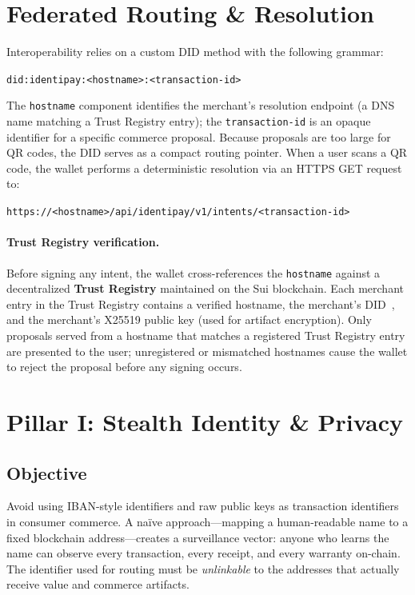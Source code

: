 \documentclass[11pt]{article}
\begin{document}
\section{Federated Routing \& Resolution}
Interoperability relies on a custom DID method with the following grammar:
\begin{center}
\texttt{did:identipay:<hostname>:<transaction-id>}
\end{center}
The \texttt{hostname} component identifies the merchant's resolution endpoint (a DNS name matching a Trust Registry entry); the \texttt{transaction-id} is an opaque identifier for a specific commerce proposal. Because proposals are too large for QR codes, the DID serves as a compact routing pointer. When a user scans a QR code, the wallet performs a deterministic resolution via an HTTPS GET request to:
\begin{center}
\texttt{https://<hostname>/api/identipay/v1/intents/<transaction-id>}
\end{center}

\paragraph{Trust Registry verification.}
Before signing any intent, the wallet cross-references the \texttt{hostname} against a decentralized \textbf{Trust Registry} maintained on the Sui blockchain. Each merchant entry in the Trust Registry contains a verified hostname, the merchant's DID~\cite{did-core}, and the merchant's X25519 public key (used for artifact encryption). Only proposals served from a hostname that matches a registered Trust Registry entry are presented to the user; unregistered or mismatched hostnames cause the wallet to reject the proposal before any signing occurs.

\section{Pillar I: Stealth Identity \& Privacy}
\subsection{Objective}
Avoid using IBAN-style identifiers and raw public keys as transaction identifiers in consumer commerce. A na\"ive approach---mapping a human-readable name to a fixed blockchain address---creates a surveillance vector: anyone who learns the name can observe every transaction, every receipt, and every warranty on-chain. The identifier used for routing must be \emph{unlinkable} to the addresses that actually receive value and commerce artifacts.
\end{document}
